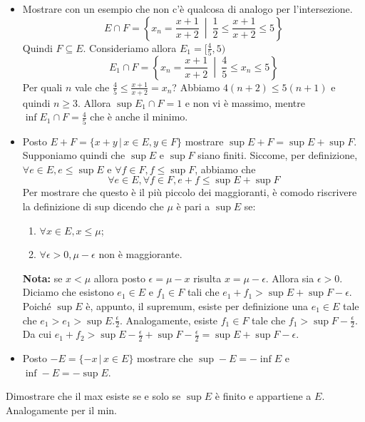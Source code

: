 \documentclass[a4paper]{article}
\begin{document}
{\begin{itemize}
        in quanto fa parte dell'insieme.
        \item Mostrare con un esempio che non c'è qualcosa di analogo per l'intersezione.
        \[
            E \cap F = \left\{ x_n = \frac{x+1}{x+2} \ \middle|\ \frac{1}{2} \leq \frac{x+1}{x+2} \leq 5 \right\}
        \]
        Quindi \(F \subseteq E\). Consideriamo allora \(E_1 = [\frac{4}{5}, 5)\)
        \[
            E_1 \cap F = \left\{ x_n = \frac{x+1}{x+2} \ \middle|\ \frac{4}{5} \leq x_n \leq 5 \right\}
        \]
        Per quali \(n\) vale che \(\frac{4}{5} \leq \frac{x+1}{x+2} = x_n\)?
        Abbiamo \(4(n+2) \leq 5(n+1)\) e quindi \(n \geq 3\).
        Allora \(\sup E_1 \cap F = 1\) e non vi è massimo, mentre \(\inf E_1 \cap F = \frac{4}{5}\)
        che è anche il minimo.
        \item Posto \(E+F = \{ x + y \,|\, x \in E, y \in F \}\)
        mostrare \(\sup E + F = \sup E + \sup F\). Supponiamo quindi che \(\sup E\) e \(\sup F\)
        siano finiti. Siccome, per definizione, \(\forall e \in E, e \leq \sup E\)
        e \(\forall f \in F, f \leq \sup F\), abbiamo che \[\forall e \in E, \forall f\in F, e + f \leq \sup E + \sup F\]
        Per mostrare che questo è il più piccolo dei maggioranti, è comodo riscrivere la definizione di
        sup dicendo che \(\mu\) è pari a \(\sup E\) se:
        \begin{enumerate}
            \item \(\forall x \in E, x\leq \mu\);
            \item \(\forall \epsilon > 0, \mu - \epsilon\) non è maggiorante.
        \end{enumerate}
        \textbf{Nota:} se \(x < \mu\) allora posto \(\epsilon = \mu - x\) risulta \(x = \mu - \epsilon\).
        Allora sia \(\epsilon > 0\). Diciamo che esistono \(e_1\in E\) e \(f_1\in F\) tali che
        \(e_1 + f_1 > \sup E + \sup F - \epsilon\).
        Poiché \(\sup E\) è, appunto, il supremum, esiste per definizione una \(e_1 \in E\) tale che
        \(e_1 > e_1 > \sup E . \frac{\epsilon}{2}\).
        Analogamente, esiste \(f_1 \in F\) tale che \(f_1 > \sup F - \frac{\epsilon}{2}\).
        Da cui \(e_1 + f_2 > \sup E - \frac{\epsilon}{2} + \sup F - \frac{\epsilon}{2} = \sup E + \sup F - \epsilon\).
        \item Posto \(-E = \{ -x \,|\, x \in E\}\) mostrare che
        \(\sup -E = -\inf E\) e \(\inf -E = -\sup E\).
    \end{itemize}
}

Dimostrare che il max esiste se e solo se \(\sup E\) è finito e appartiene a \(E\).
Analogamente per il min.
\end{document}
